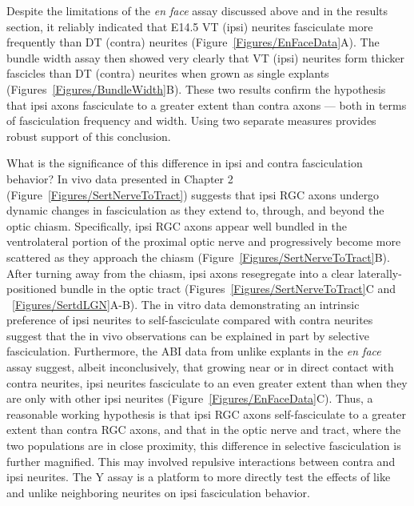 Despite the limitations of the \emph{en face} assay discussed above and in the results section, it reliably indicated that E14.5 VT (ipsi) neurites fasciculate more frequently than DT (contra) neurites (Figure~\ref{Figures/EnFaceData}A).
The bundle width assay then showed very clearly that VT (ipsi) neurites form thicker fascicles than DT (contra) neurites when grown as single explants (Figures~\ref{Figures/BundleWidth}B).
These two results confirm the hypothesis that ipsi axons fasciculate to a greater extent than contra axons --- both in terms of fasciculation frequency and width.
Using two separate measures provides robust support of this conclusion.

What is the significance of this difference in ipsi and contra fasciculation behavior?
In vivo data presented in Chapter 2 (Figure~\ref{Figures/SertNerveToTract}) suggests that ipsi RGC axons undergo dynamic changes in fasciculation as they extend to, through, and beyond the optic chiasm.
Specifically, ipsi RGC axons appear well bundled in the ventrolateral portion of the proximal optic nerve and progressively become more scattered as they approach the chiasm (Figure~\ref{Figures/SertNerveToTract}B).
After turning away from the chiasm, ipsi axons resegregate into a clear laterally-positioned bundle in the optic tract (Figures~\ref{Figures/SertNerveToTract}C and ~\ref{Figures/SertdLGN}A-B).
The in vitro data demonstrating an intrinsic preference of ipsi neurites to self-fasciculate compared with contra neurites suggest that the in vivo observations can be explained in part by selective fasciculation.
Furthermore, the ABI data from unlike explants in the \emph{en face} assay suggest, albeit inconclusively, that growing near or in direct contact with contra neurites, ipsi neurites fasciculate to an even greater extent than when they are only with other ipsi neurites (Figure~\ref{Figures/EnFaceData}C).
Thus, a reasonable working hypothesis is that ipsi RGC axons self-fasciculate to a greater extent than contra RGC axons, and that in the optic nerve and tract, where the two populations are in close proximity, this difference in selective fasciculation is further magnified.
This may involved repulsive interactions between contra and ipsi neurites.
The Y assay is a platform to more directly test the effects of like and unlike neighboring neurites on ipsi fasciculation behavior.

